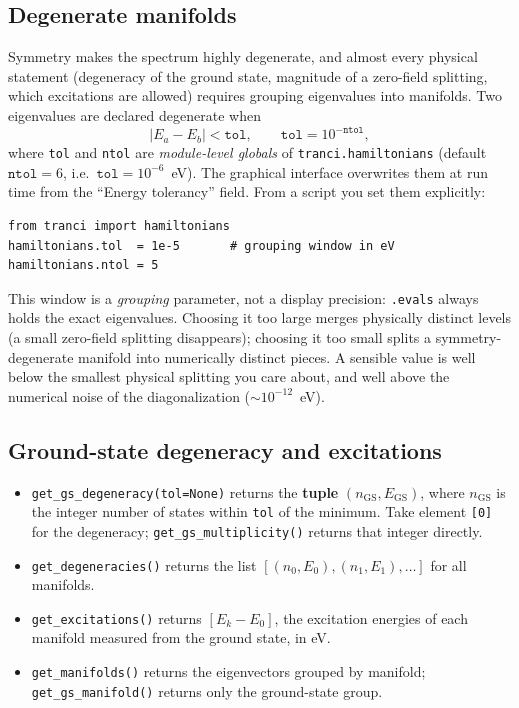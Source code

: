 \documentclass[11pt,a4paper]{article}
\newcommand{\op}[1]{\texttt{#1}}
\begin{document}
\subsection{Degenerate manifolds}

Symmetry makes the spectrum highly degenerate, and almost every physical
statement (degeneracy of the ground state, magnitude of a zero-field splitting,
which excitations are allowed) requires grouping eigenvalues into manifolds.
Two eigenvalues are declared degenerate when
\begin{equation}
  |E_a - E_b| < \texttt{tol},
  \qquad \texttt{tol} = 10^{-\texttt{ntol}} ,
\end{equation}
where \op{tol} and \op{ntol} are \emph{module-level globals} of
\op{tranci.hamiltonians} (default $\op{ntol}=6$, i.e.\ $\op{tol}=10^{-6}$~eV).
The graphical interface overwrites them at run time from the
``Energy tolerancy'' field.  From a script you set them explicitly:

\begin{lstlisting}
from tranci import hamiltonians
hamiltonians.tol  = 1e-5       # grouping window in eV
hamiltonians.ntol = 5
\end{lstlisting}

\noindent
This window is a \emph{grouping} parameter, not a display precision:
\op{.evals} always holds the exact eigenvalues.  Choosing it too large merges
physically distinct levels (a small zero-field splitting disappears); choosing
it too small splits a symmetry-degenerate manifold into numerically distinct
pieces.  A sensible value is well below the smallest physical splitting you care
about, and well above the numerical noise of the diagonalization
($\sim10^{-12}$~eV).

\subsection{Ground-state degeneracy and excitations}

\begin{itemize}
\item \op{get\_gs\_degeneracy(tol=None)} returns the \textbf{tuple}
      $(n_{\mathrm{GS}}, E_{\mathrm{GS}})$, where $n_{\mathrm{GS}}$ is the
      integer number of states within \op{tol} of the minimum.  Take
      element \op{[0]} for the degeneracy; \op{get\_gs\_multiplicity()} returns
      that integer directly.
\item \op{get\_degeneracies()} returns the list
      $[(n_0,E_0),(n_1,E_1),\ldots]$ for all manifolds.
\item \op{get\_excitations()} returns $[E_k-E_0]$, the excitation energies of
      each manifold measured from the ground state, in eV.
\item \op{get\_manifolds()} returns the eigenvectors grouped by manifold;
      \op{get\_gs\_manifold()} returns only the ground-state group.
\end{itemize}
\end{document}
